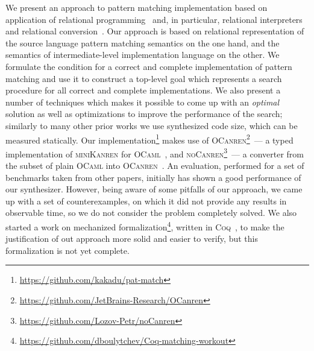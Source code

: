 We present an approach to pattern matching implementation based on application of relational programming~\cite{TRS,WillThesis} and, in particular, relational interpreters~\cite{unified}
and relational conversion~\cite{lozov2017}. Our approach is based on relational representation of the source language pattern matching semantics on the one hand, and
the semantics of intermediate-level implementation language on the other. We formulate the condition for a correct and complete implementation of pattern matching and use it to
construct a top-level goal which represents a search procedure for all correct and complete implementations. We also present a number of techniques which makes it possible to come up with an
\emph{optimal} solution as well as optimizations to improve the performance of the search; similarly to many other prior works we use synthesized code size, which can be measured statically.
Our implementation\footnote{\url{https://github.com/kakadu/pat-match}} makes use of \textsc{OCanren}\footnote{\url{https://github.com/JetBrains-Research/OCanren}}~--- a typed
implementation of \textsc{miniKanren} for \textsc{OCaml}~\cite{OCanren}, and \textsc{noCanren}\footnote{\url{https://github.com/Lozov-Petr/noCanren}}~--- a converter from the subset
of plain \textsc{OCaml} into \textsc{OCanren}~\cite{lozov2017}. An evaluation, performed for a set of benchmarks taken from other papers, initially has shown a good performance of our synthesizer.
However, being aware of some pitfalls of our approach, we came up with a set of counterexamples, on which it did not provide any results in observable time, so we do not consider the problem
completely solved. We also started a work on mechanized formalization\footnote{\url{https://github.com/dboulytchev/Coq-matching-workout}}, written in \textsc{Coq}~\cite{Coq}, to
make the justification of out approach more solid and easier to verify, but this formalization is not yet complete. 

 
